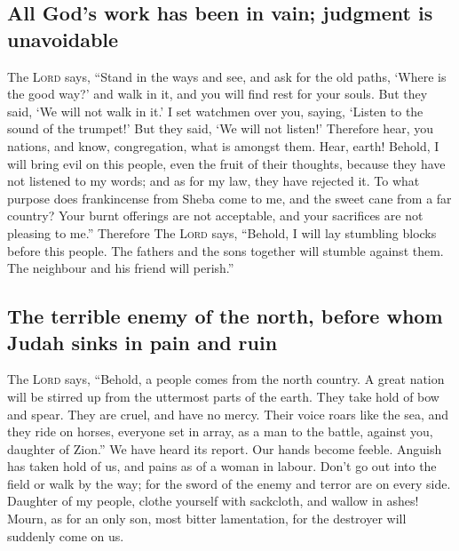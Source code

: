 \hypertarget{all-gods-work-has-been-in-vain-judgment-is-unavoidable}{%
\subsection{All God's work has been in vain; judgment is
unavoidable}\label{all-gods-work-has-been-in-vain-judgment-is-unavoidable}}

 The \textsc{Lord} says, ``Stand in the ways and see, and
ask for the old paths, `Where is the good way?' and walk in it, and you
will find rest for your souls. But they said, `We will not walk in it.'
 I set watchmen over you, saying, `Listen to the sound of
the trumpet!' But they said, `We will not listen!' 
Therefore hear, you nations, and know, congregation, what is amongst
them.  Hear, earth! Behold, I will bring evil on this
people, even the fruit of their thoughts, because they have not listened
to my words; and as for my law, they have rejected it. 
To what purpose does frankincense from Sheba come to me, and the sweet
cane from a far country? Your burnt offerings are not acceptable, and
your sacrifices are not pleasing to me.''  Therefore The
\textsc{Lord} says, ``Behold, I will lay stumbling blocks before this
people. The fathers and the sons together will stumble against them. The
neighbour and his friend will perish.''

\hypertarget{the-terrible-enemy-of-the-north-before-whom-judah-sinks-in-pain-and-ruin}{%
\subsection{The terrible enemy of the north, before whom Judah sinks in
pain and
ruin}\label{the-terrible-enemy-of-the-north-before-whom-judah-sinks-in-pain-and-ruin}}

 The \textsc{Lord} says, ``Behold, a people comes from
the north country. A great nation will be stirred up from the uttermost
parts of the earth.  They take hold of bow and spear.
They are cruel, and have no mercy. Their voice roars like the sea, and
they ride on horses, everyone set in array, as a man to the battle,
against you, daughter of Zion.''  We have heard its
report. Our hands become feeble. Anguish has taken hold of us, and pains
as of a woman in labour.  Don't go out into the field or
walk by the way; for the sword of the enemy and terror are on every
side.  Daughter of my people, clothe yourself with
sackcloth, and wallow in ashes! Mourn, as for an only son, most bitter
lamentation, for the destroyer will suddenly come on us.


